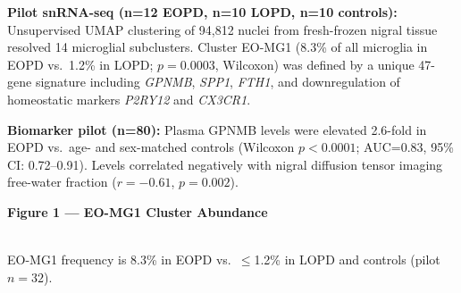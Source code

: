 \begin{minipage}[t]{0.55\linewidth}
  \textbf{Pilot snRNA-seq (n=12 EOPD, n=10 LOPD, n=10 controls):} Unsupervised UMAP clustering of 94,812 nuclei from fresh-frozen nigral tissue resolved 14 microglial subclusters. Cluster EO-MG1 (8.3\% of all microglia in EOPD vs.\ 1.2\% in LOPD; $p=0.0003$, Wilcoxon) was defined by a unique 47-gene signature including \textit{GPNMB}, \textit{SPP1}, \textit{FTH1}, and downregulation of homeostatic markers \textit{P2RY12} and \textit{CX3CR1}.

  \textbf{Biomarker pilot (n=80):} Plasma GPNMB levels were elevated 2.6-fold in EOPD vs.\ age- and sex-matched controls (Wilcoxon $p<0.0001$; AUC=0.83, 95\% CI: 0.72--0.91). Levels correlated negatively with nigral diffusion tensor imaging free-water fraction ($r=-0.61$, $p=0.002$).
\end{minipage}%
\hfill
\begin{minipage}[t]{0.42\linewidth}
  \begin{tcolorbox}[
    enhanced,
    colback=cihrLightGray,
    colframe=cihrGold,
    sharp corners, boxrule=1pt,
    left=6pt, right=6pt, top=5pt, bottom=5pt,
    parbox=false
  ]
    \centering
    {\fontsize{8}{10}\selectfont\textbf{\textcolor{cihrNavy}{Figure 1 --- EO-MG1 Cluster Abundance}}}\\[4pt]
    \\[3pt]
    {\fontsize{7}{9}\selectfont\color{cihrDarkGray}EO-MG1 frequency is 8.3\% in EOPD vs.\ $\leq$1.2\% in LOPD and controls (pilot $n=32$).}
  \end{tcolorbox}
\end{minipage}

